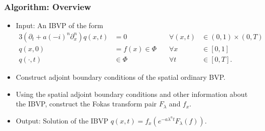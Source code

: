 \documentclass{beamer}
\begin{document}
\begin{frame}
    \frametitle{Algorithm: Overview}
    \begin{itemize}\setlength\itemsep{1em}
        \item Input: An IBVP of the form
            \begin{alignat*}{3}
                \left(\partial_t + a(-i)^n \partial_x^n \right)q(x,t) &= 0\quad &\forall (x,t)&\in (0,1)\times (0,T) \\
                q(x,0) &= f(x)\in \Phi\quad &\forall x&\in [0,1]\\
                q(\cdot, t) &\in \Phi \quad &\forall t&\in [0,T].
            \end{alignat*}
        \item Construct adjoint boundary conditions of the spatial ordinary BVP.
        \item Using the spatial adjoint boundary conditions and other information about the IBVP, construct the Fokas transform pair $F_\lambda$ and $f_x$.
        \item Output: Solution of the IBVP $q(x,t) = f_x(e^{-a\lambda^n t}F_\lambda(f))$.
    \end{itemize}
\end{frame}



    
\end{document}
